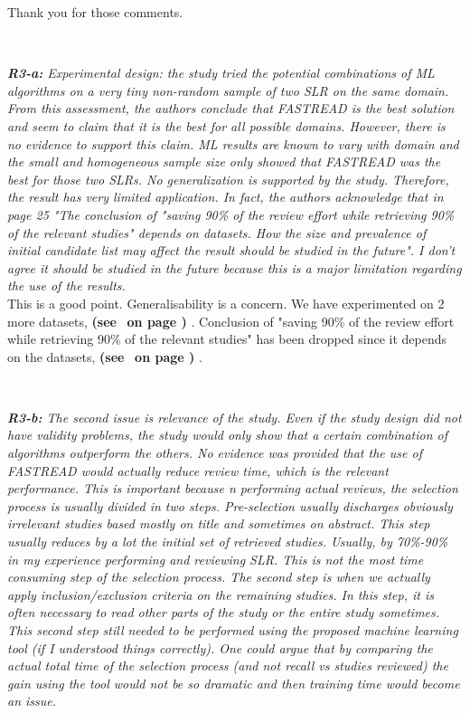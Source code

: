 \documentclass{svjour3}
\theoremstyle{break}
\newcommand{\review}[1]{{\textit{#1}}~\\}
\newcommand{\citeresp}[1]{
{\bf (see } \fcolorbox{black}{black!15}{
 \bf
  \scriptsize R-{#1}}~{\bf{on page \pageref{response:#1})}}
}
\begin{document}
Thank you for those comments. 
\par ~

\review{\textbf{R3-a:} Experimental design: the study tried the potential combinations of ML algorithms on a very tiny non-random sample of two SLR on the same domain. From this assessment, the authors conclude that FASTREAD is the best solution and seem to claim that it is the best for all possible domains. However, there is no evidence to support this claim. ML results are known to vary with domain and the small and homogeneous sample size only showed that FASTREAD was the best for those two SLRs. No generalization is supported by the study. Therefore, the result has very limited application. In fact, the authors acknowledge that in page 25 "The conclusion of "saving 90\% of the review effort while retrieving 90\% of the relevant studies" depends on datasets. How the size and prevalence of initial candidate list may affect the result should be studied in the future". I don't agree it should be studied in the future because this is a major limitation regarding the use of the results.}

This is a good point. Generalisability is a concern. We have experimented on 2 more datasets, \citeresp{2e2}. Conclusion of "saving 90\% of the review effort while retrieving 90\% of the relevant studies" has been dropped since it depends on the datasets, \citeresp{2e1}.

\par ~

\review{\textbf{R3-b:} The second issue is relevance of the study. Even if the study design did not have validity problems, the study would only show that a certain combination of algorithms outperform the others. No evidence was provided that the use of FASTREAD would actually reduce review time, which is the relevant performance. This is important because n performing actual reviews, the selection process is usually divided in two steps. Pre-selection usually discharges obviously irrelevant studies based mostly on title and sometimes on abstract. This step usually reduces by a lot the initial set of retrieved studies. Usually, by 70\%-90\% in my experience performing and reviewing SLR. This is not the most time consuming step of the selection process. The second step is when we actually apply inclusion/exclusion criteria on the remaining studies. In this step, it is often necessary to read other parts of the study or the entire study sometimes. This second step still needed to be performed using the proposed machine learning tool (if I understood things correctly). One could argue that by comparing the actual total time of the selection process (and not recall vs studies reviewed) the gain using the tool would not be so dramatic and then training time would become an issue.}
\end{document}
